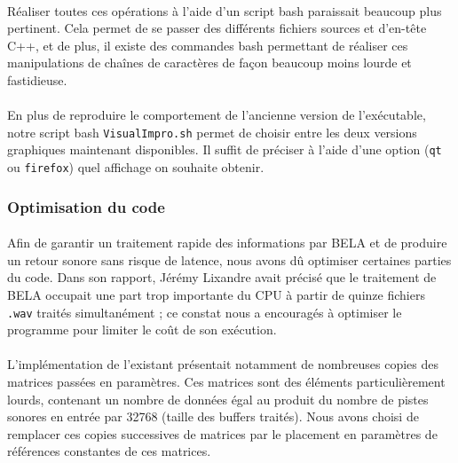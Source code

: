 \paragraph{}
Réaliser toutes ces opérations à l'aide d'un script bash paraissait
beaucoup plus pertinent. Cela permet de se passer des différents
fichiers sources et d'en-tête C++, et de plus, il existe des commandes
bash permettant de réaliser ces manipulations de chaînes de caractères
de façon beaucoup moins lourde et fastidieuse.
\paragraph{}
En plus de reproduire le comportement de l'ancienne version de
l'exécutable, notre script bash \verb!VisualImpro.sh! permet de
choisir entre les deux versions graphiques maintenant disponibles. Il
suffit de préciser à l'aide d'une option (\verb!qt! ou \verb!firefox!)
quel affichage on souhaite obtenir.

\subsubsection{Optimisation du code}
\paragraph{}
Afin de garantir un traitement rapide des informations par BELA et de
produire un retour sonore sans risque de latence, nous avons dû
optimiser certaines parties du code. Dans son rapport, Jérémy Lixandre
avait précisé que le traitement de BELA occupait une part trop
importante du CPU à partir de quinze fichiers \verb!.wav! traités
simultanément ; ce constat nous a encouragés à optimiser le programme
pour limiter le coût de son exécution.
\paragraph{}
L'implémentation de l'existant présentait notamment de nombreuses
copies des matrices passées en paramètres. Ces matrices sont des
éléments particulièrement lourds, contenant un nombre de données égal
au produit du nombre de pistes sonores en entrée par 32768 (taille des
buffers traités). Nous avons choisi de remplacer ces copies
successives de matrices par le placement en paramètres de références
constantes de ces matrices.

